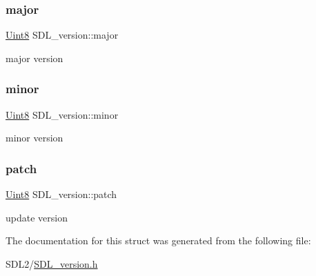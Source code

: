 \subsubsection{\texorpdfstring{major}{major}}
{\footnotesize\ttfamily \hyperlink{_s_d_l__stdinc_8h_a2944638813a090aa23e62f4da842c3e2}{Uint8} S\+D\+L\+\_\+version\+::major}

major version \mbox{\label{struct_s_d_l__version_a6c35c7bf80245028d5970e6a504ecf57}} 
\subsubsection{\texorpdfstring{minor}{minor}}
{\footnotesize\ttfamily \hyperlink{_s_d_l__stdinc_8h_a2944638813a090aa23e62f4da842c3e2}{Uint8} S\+D\+L\+\_\+version\+::minor}

minor version \mbox{\label{struct_s_d_l__version_aa6dacff18edee8cd037c773b843be0f1}} 
\subsubsection{\texorpdfstring{patch}{patch}}
{\footnotesize\ttfamily \hyperlink{_s_d_l__stdinc_8h_a2944638813a090aa23e62f4da842c3e2}{Uint8} S\+D\+L\+\_\+version\+::patch}

update version 

The documentation for this struct was generated from the following file\+:\begin{DoxyCompactItemize}
\item 
S\+D\+L2/\hyperlink{_s_d_l__version_8h}{S\+D\+L\+\_\+version.\+h}\end{DoxyCompactItemize}
